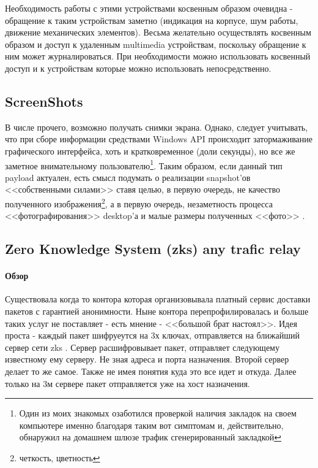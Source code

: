 Необходимость работы с этими устройствами косвенным образом очевидна -
обращение к таким устройствам заметно (индикация на корпусе, шум работы,
движение механических элементов). Весьма желательно осуществлять
косвенным образом и доступ к удаленным multimedia устройствам, поскольку
обращение к ним может журналироваться. При необходимости можно использовать
косвенный доступ и к устройствам которые можно использовать непосредственно.

\subsection{ScreenShots}

В числе прочего, возможно получать снимки экрана. Однако, следует
учитывать, что при сборе информации средствами Windows API происходит
затормаживание графического интерфейса, хоть и кратковременное  (доли
секунды), но все же заметное внимательному пользователю\footnote{Один из
моих знакомых  озаботился проверкой наличия закладок на своем компьютере
именно благодаря таким вот симптомам и, действительно, обнаружил на
домашнем шлюзе трафик сгенерированный закладкой}. Таким образом, если
данный тип  payload актуален, есть смысл подумать о реализации
snapshot'ов <<собственными силами>> ставя  целью, в первую очередь, не
качество полученного изображения\footnote{четкость, цветность}, а в
первую очередь, незаметность процесса <<фотографирования>> desktop'а и
малые размеры полученных <<фото>> .


\subsection{Zero Knowledge System (zks) any trafic relay}

\paragraph{Обзор}

Существовала когда то контора которая организовывала платный сервис
доставки пакетов с гарантией  анонимности. Ныне контора
перепрофилировалась и больше таких услуг не поставляет - есть
мнение - <<большой брат настоял>>. Идея проста - каждый пакет
шифруеутся на 3х ключах, отправляется на ближайший сервер сети
zks . Сервер расшифровывает пакет, отправляет следующему известному
ему серверу. Не зная адреса и порта назначения. Второй сервер делает то
же самое. Также не имея понятия куда это все идет и откуда. Далее только
на 3м сервере пакет  отправляется уже на хост назначения.\\

